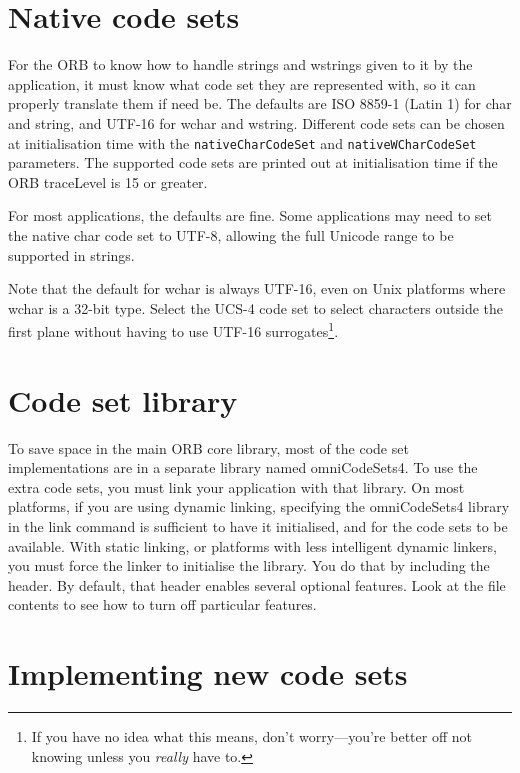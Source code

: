 \documentclass[11pt,twoside,a4paper]{book}
\newcommand{\code}[1]{\texttt{#1}}
\newcommand{\file}{\begingroup \urlstyle{tt}\Url}
\begin{document}
\section{Native code sets}

For the ORB to know how to handle strings and wstrings given to it by
the application, it must know what code set they are represented
with, so it can properly translate them if need be. The defaults are
ISO 8859-1 (Latin 1) for char and string, and UTF-16 for wchar and
wstring. Different code sets can be chosen at initialisation time with
the \code{nativeCharCodeSet} and \code{nativeWCharCodeSet}
parameters. The supported code sets are printed out at initialisation
time if the ORB traceLevel is 15 or greater.

For most applications, the defaults are fine. Some applications may
need to set the native char code set to UTF-8, allowing the full
Unicode range to be supported in strings.

Note that the default for wchar is always UTF-16, even on Unix
platforms where wchar is a 32-bit type. Select the UCS-4 code set to
select characters outside the first plane without having to use UTF-16
surrogates\footnote{If you have no idea what this means, don't
worry---you're better off not knowing unless you \emph{really} have
to.}.


\section{Code set library}

To save space in the main ORB core library, most of the code set
implementations are in a separate library named omniCodeSets4. To use
the extra code sets, you must link your application with that
library. On most platforms, if you are using dynamic linking,
specifying the omniCodeSets4 library in the link command is sufficient
to have it initialised, and for the code sets to be available. With
static linking, or platforms with less intelligent dynamic linkers,
you must force the linker to initialise the library. You do that by
including the \file{omniORB4/optionalFeatures.h} header. By default,
that header enables several optional features. Look at the file
contents to see how to turn off particular features.


\section{Implementing new code sets}
\end{document}
